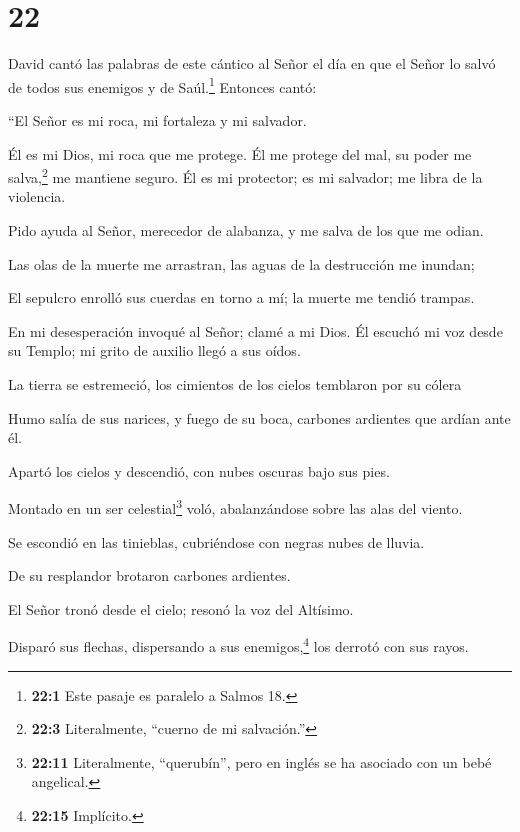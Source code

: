 \hypertarget{section-21}{%
\section{22}\label{section-21}}

 David cantó las palabras de este cántico al Señor el día en
que el Señor lo salvó de todos sus enemigos y de Saúl.\footnote{\textbf{22:1}
  Este pasaje es paralelo a Salmos 18.}  Entonces cantó:

``El Señor es mi roca, mi fortaleza y mi salvador.

 Él es mi Dios, mi roca que me protege. Él me protege del
mal, su poder me salva,\footnote{\textbf{22:3} Literalmente, ``cuerno de
  mi salvación.''} me mantiene seguro. Él es mi protector; es mi
salvador; me libra de la violencia.

 Pido ayuda al Señor, merecedor de alabanza, y me salva de
los que me odian.

 Las olas de la muerte me arrastran, las aguas de la
destrucción me inundan;

 El sepulcro enrolló sus cuerdas en torno a mí; la muerte me
tendió trampas.

 En mi desesperación invoqué al Señor; clamé a mi Dios. Él
escuchó mi voz desde su Templo; mi grito de auxilio llegó a sus oídos.

 La tierra se estremeció, los cimientos de los cielos
temblaron por su cólera

 Humo salía de sus narices, y fuego de su boca, carbones
ardientes que ardían ante él.

 Apartó los cielos y descendió, con nubes oscuras bajo sus
pies.

 Montado en un ser celestial\footnote{\textbf{22:11}
  Literalmente, ``querubín'', pero en inglés se ha asociado con un bebé
  angelical.} voló, abalanzándose sobre las alas del viento.

 Se escondió en las tinieblas, cubriéndose con negras nubes
de lluvia.

 De su resplandor brotaron carbones ardientes.

 El Señor tronó desde el cielo; resonó la voz del Altísimo.

 Disparó sus flechas, dispersando a sus
enemigos,\footnote{\textbf{22:15} Implícito.} los derrotó con sus rayos.

